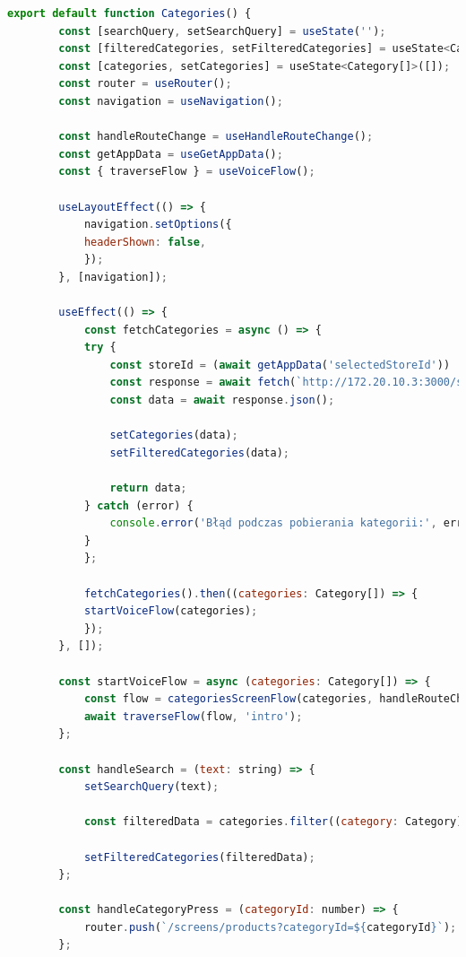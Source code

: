 \begin{lstlisting}[language=JavaScript, caption=Ekran produkt implementacja, label=lst:service]
    export default function Categories() {
        const [searchQuery, setSearchQuery] = useState('');
        const [filteredCategories, setFilteredCategories] = useState<Category[]>([]);
        const [categories, setCategories] = useState<Category[]>([]);
        const router = useRouter();
        const navigation = useNavigation();

        const handleRouteChange = useHandleRouteChange();
        const getAppData = useGetAppData();
        const { traverseFlow } = useVoiceFlow();

        useLayoutEffect(() => {
            navigation.setOptions({
            headerShown: false,
            });
        }, [navigation]);

        useEffect(() => {
            const fetchCategories = async () => {
            try {
                const storeId = (await getAppData('selectedStoreId')) || 1;
                const response = await fetch(`http://172.20.10.3:3000/stores/${storeId}/categories`);
                const data = await response.json();

                setCategories(data);
                setFilteredCategories(data);

                return data;
            } catch (error) {
                console.error('Błąd podczas pobierania kategorii:', error);
            }
            };

            fetchCategories().then((categories: Category[]) => {
            startVoiceFlow(categories);
            });
        }, []);

        const startVoiceFlow = async (categories: Category[]) => {
            const flow = categoriesScreenFlow(categories, handleRouteChange, router);
            await traverseFlow(flow, 'intro');
        };

        const handleSearch = (text: string) => {
            setSearchQuery(text);

            const filteredData = categories.filter((category: Category) => category.category_name.toLowerCase().includes(text.toLowerCase()));

            setFilteredCategories(filteredData);
        };

        const handleCategoryPress = (categoryId: number) => {
            router.push(`/screens/products?categoryId=${categoryId}`);
        };


\end{lstlisting}
